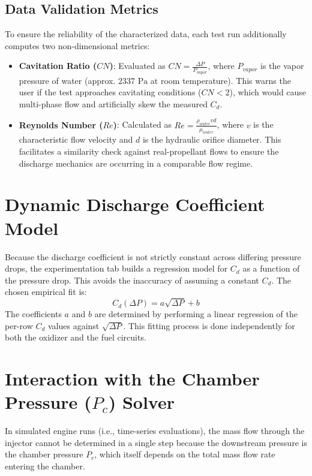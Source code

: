 \documentclass[12pt]{article}
\begin{document}
\subsection{Data Validation Metrics}
To ensure the reliability of the characterized data, each test run additionally computes two non-dimensional metrics:
\begin{itemize}
    \item \textbf{Cavitation Ratio ($CN$)}: Evaluated as $CN = \frac{\Delta P}{P_{vapor}}$, where $P_{vapor}$ is the vapor pressure of water (approx. $2337\text{ Pa}$ at room temperature). This warns the user if the test approaches cavitating conditions ($CN < 2$), which would cause multi-phase flow and artificially skew the measured $C_d$.
    \item \textbf{Reynolds Number ($Re$)}: Calculated as $Re = \frac{\rho_{water} v d}{\mu_{water}}$, where $v$ is the characteristic flow velocity and $d$ is the hydraulic orifice diameter. This facilitates a similarity check against real-propellant flows to ensure the discharge mechanics are occurring in a comparable flow regime.
\end{itemize}

\section{Dynamic Discharge Coefficient Model}
Because the discharge coefficient is not strictly constant across differing pressure drops, the experimentation tab builds a regression model for $C_d$ as a function of the pressure drop. This avoids the inaccuracy of assuming a constant $C_d$. The chosen empirical fit is:
\begin{equation}
C_d(\Delta P) = a \sqrt{\Delta P} + b
\end{equation}
The coefficients $a$ and $b$ are determined by performing a linear regression of the per-row $C_d$ values against $\sqrt{\Delta P}$. This fitting process is done independently for both the oxidizer and the fuel circuits.

\section{Interaction with the Chamber Pressure ($P_c$) Solver}
In simulated engine runs (i.e., time-series evaluations), the mass flow through the injector cannot be determined in a single step because the downstream pressure is the chamber pressure $P_c$, which itself depends on the total mass flow rate entering the chamber.
\end{document}
